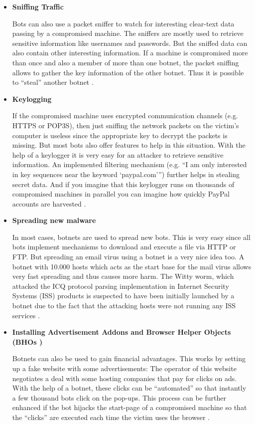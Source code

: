 \documentclass[]{article}
\begin{document}
\begin{itemize}
\item \textbf{Sniffing Traffic}

Bots can also use a packet sniffer to watch for interesting clear-text data passing by a compromised machine. The sniffers are mostly used to retrieve sensitive information like usernames and passwords. But the sniffed data can also contain other interesting information. If a machine is compromised more than once and also a member of more than one botnet, the packet sniffing allows to gather the key information of the other botnet. Thus it is possible to “steal” another botnet \cite{article:honeypot-tracking}.

\item \textbf{Keylogging}

If the compromised machine uses encrypted communication channels (e.g. HTTPS or POP3S), then just sniffing the network packets on the victim’s computer is useless since the appropriate key to decrypt the packets is missing. But most bots also offer features to help in this situation. With the help of a keylogger it is very easy for an attacker to retrieve sensitive information. An implemented filtering mechanism (e.g. “I am only interested in key sequences near the keyword ‘paypal.com’”) further helps in stealing secret data. And if you imagine that this keylogger runs on thousands of compromised machines in parallel you can imagine how quickly PayPal accounts are harvested \cite{article:honeypot-tracking}.

\item \textbf{Spreading new malware}

In most cases, botnets are used to spread new bots. This is very easy since all bots implement mechanisms to download and execute a file via HTTP or FTP. But spreading an email virus using a botnet is a very nice idea too. A botnet with 10.000 hosts which acts as the start base for the mail virus allows very fast spreading and thus causes more harm. The Witty worm, which attacked the ICQ protocol parsing implementation in Internet Security Systems (ISS) products is suspected to have been initially launched by a botnet due to the fact that the attacking hosts were not running any ISS services \cite{article:honeypot-tracking}.

\item \textbf{Installing Advertisement Addons and Browser Helper Objects (BHOs \cite{website:bho})}

Botnets can also be used to gain financial advantages. This works by setting up a fake website with some advertisements: The operator of this website negotiates a deal with some hosting companies that pay for clicks on ads. With the help of a botnet, these clicks can be “automated” so that instantly a few thousand bots click on the pop-ups. This process can be further enhanced if the bot hijacks the start-page of a compromised machine so that the “clicks” are executed each time the victim uses the browser \cite{article:honeypot-tracking} \cite{website:bho}.


\end{itemize}
\end{document}
